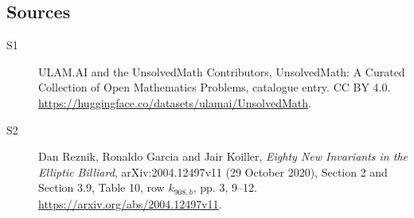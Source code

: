 \documentclass[11pt]{article}
\begin{document}
\subsection{Sources}
\begin{description}
\item[\hypertarget{source:statement:1}{S1}] ULAM.AI and the UnsolvedMath Contributors, UnsolvedMath: A Curated Collection of Open Mathematics Problems, catalogue entry. CC BY 4.0. \url{https://huggingface.co/datasets/ulamai/UnsolvedMath}.
\item[\hypertarget{source:statement:2}{S2}] Dan Reznik, Ronaldo Garcia and Jair Koiller, \emph{Eighty New Invariants in the Elliptic Billiard}, arXiv:2004.12497v11 (29 October 2020), Section 2 and Section 3.9, Table 10, row $k_{908,b}$, pp. 3, 9--12. \url{https://arxiv.org/abs/2004.12497v11}.
\end{description}
\label{end:statement}
\end{document}
